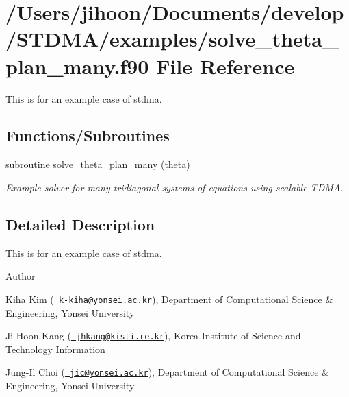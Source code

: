 \hypertarget{solve__theta__plan__many_8f90}{}\section{/\+Users/jihoon/\+Documents/develop/\+S\+T\+D\+M\+A/examples/solve\+\_\+theta\+\_\+plan\+\_\+many.f90 File Reference}
\label{solve__theta__plan__many_8f90}


This is for an example case of stdma.  


\subsection*{Functions/\+Subroutines}
\begin{DoxyCompactItemize}
\item 
subroutine \mbox{\hyperlink{solve__theta__plan__many_8f90_af048018fcdfbe66e00922dee3e7e9a64}{solve\+\_\+theta\+\_\+plan\+\_\+many}} (theta)
\begin{DoxyCompactList}\small\item\em Example solver for many tridiagonal systems of equations using scalable T\+D\+MA. \end{DoxyCompactList}\end{DoxyCompactItemize}


\subsection{Detailed Description}
This is for an example case of stdma. 

\begin{DoxyAuthor}{Author}

\end{DoxyAuthor}

\begin{DoxyItemize}
\item Kiha Kim (\href{mailto:k-kiha@yonsei.ac.kr}{\texttt{ k-\/kiha@yonsei.\+ac.\+kr}}), Department of Computational Science \& Engineering, Yonsei University
\item Ji-\/\+Hoon Kang (\href{mailto:jhkang@kisti.re.kr}{\texttt{ jhkang@kisti.\+re.\+kr}}), Korea Institute of Science and Technology Information
\item Jung-\/\+Il Choi (\href{mailto:jic@yonsei.ac.kr}{\texttt{ jic@yonsei.\+ac.\+kr}}), Department of Computational Science \& Engineering, Yonsei University
\end{DoxyItemize}

